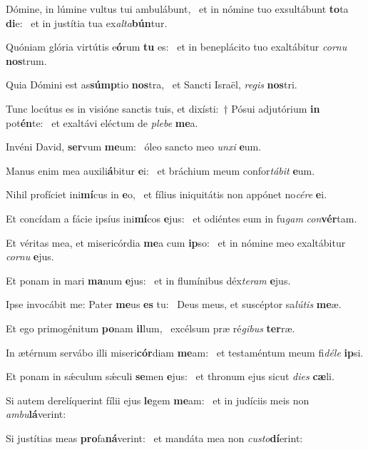 \item Dómine, in lúmine vultus tui ambulábunt,~\pscross{} et in nómine tuo exsultábunt \textbf{to}ta \textbf{di}e:~\psstar{} et in justítia tua ex\textit{alta}\textbf{bún}tur.
\item Quóniam glória virtútis e\textbf{ó}rum \textbf{tu} es:~\psstar{} et in beneplácito tuo exaltábitur \textit{cornu} \textbf{nos}trum.
\item Quia Dómini est as\textbf{súmp}tio \textbf{nos}tra,~\psstar{} et Sancti Israël, \textit{regis} \textbf{nos}tri.
\item Tunc locútus es in visióne sanctis tuis, et dixísti:~† Pósui adjutórium \textbf{in} pot\textbf{én}te:~\psstar{} et exaltávi eléctum de \textit{plebe} \textbf{me}a.
\item Invéni David, \textbf{ser}vum \textbf{me}um:~\psstar{} óleo sancto meo \textit{unxi} \textbf{e}um.
\item Manus enim mea auxili\textbf{á}bitur \textbf{e}i:~\psstar{} et bráchium meum confor\textit{tábit} \textbf{e}um.
\item Nihil profíciet ini\textbf{mí}cus in \textbf{e}o,~\psstar{} et fílius iniquitátis non appónet no\textit{cére} \textbf{e}i.
\item Et concídam a fácie ipsíus ini\textbf{mí}cos \textbf{e}jus:~\psstar{} et odiéntes eum in fu\textit{gam} \textit{con}\textbf{vér}tam.
\item Et véritas mea, et misericórdia \textbf{me}a cum \textbf{ip}so:~\psstar{} et in nómine meo exaltábitur \textit{cornu} \textbf{e}jus.
\item Et ponam in mari \textbf{ma}num \textbf{e}jus:~\psstar{} et in flumínibus déx\textit{teram} \textbf{e}jus.
\item Ipse invocábit me: Pater \textbf{me}us \textbf{es} tu:~\psstar{} Deus meus, et suscéptor sa\textit{lútis} \textbf{me}æ.
\item Et ego primogénitum \textbf{po}nam \textbf{il}lum,~\psstar{} excélsum præ ré\textit{gibus} \textbf{ter}ræ.
\item In ætérnum servábo illi miseri\textbf{cór}diam \textbf{me}am:~\psstar{} et testaméntum meum fi\textit{déle} \textbf{ip}si.
\item Et ponam in sǽculum sǽculi \textbf{se}men \textbf{e}jus:~\psstar{} et thronum ejus sicut \textit{dies} \textbf{cæ}li.
\item Si autem derelíquerint fílii ejus \textbf{le}gem \textbf{me}am:~\psstar{} et in judíciis meis non \textit{ambu}\textbf{lá}verint:
\item Si justítias meas \textbf{pro}fa\textbf{ná}ve\-rint:~\psstar{} et mandáta mea non \textit{custo}\textbf{dí}erint:
